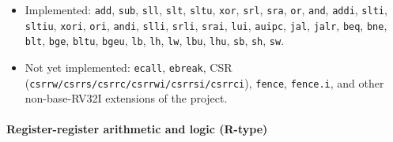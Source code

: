 \documentclass[]{article}
\providecommand{\tightlist}{%
  \setlength{\itemsep}{0pt}\setlength{\parskip}{0pt}}
\let\oldparagraph\paragraph
\renewcommand{\paragraph}[1]{\oldparagraph{#1}\mbox{}}
\begin{document}
\begin{itemize}
\tightlist
\item
  Implemented: \texttt{add}, \texttt{sub}, \texttt{sll}, \texttt{slt},
  \texttt{sltu}, \texttt{xor}, \texttt{srl}, \texttt{sra}, \texttt{or},
  \texttt{and}, \texttt{addi}, \texttt{slti}, \texttt{sltiu},
  \texttt{xori}, \texttt{ori}, \texttt{andi}, \texttt{slli},
  \texttt{srli}, \texttt{srai}, \texttt{lui}, \texttt{auipc},
  \texttt{jal}, \texttt{jalr}, \texttt{beq}, \texttt{bne}, \texttt{blt},
  \texttt{bge}, \texttt{bltu}, \texttt{bgeu}, \texttt{lb}, \texttt{lh},
  \texttt{lw}, \texttt{lbu}, \texttt{lhu}, \texttt{sb}, \texttt{sh},
  \texttt{sw}.
\item
  Not yet implemented: \texttt{ecall}, \texttt{ebreak}, CSR
  (\texttt{csrrw/csrrs/csrrc/csrrwi/csrrsi/csrrci}), \texttt{fence},
  \texttt{fence.i}, and other non-base-RV32I extensions of the project.
\end{itemize}

\hypertarget{register-register-arithmetic-and-logic-r-type}{%
\paragraph{Register-register arithmetic and logic
(R-type)}\label{register-register-arithmetic-and-logic-r-type}}
\end{document}
